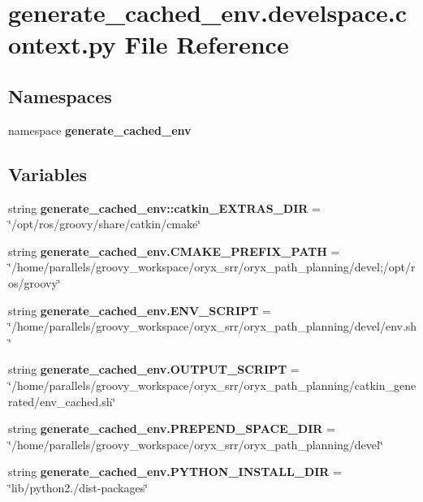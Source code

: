\section{generate\-\_\-cached\-\_\-env.\-develspace.\-context.\-py \-File \-Reference}
\label{generate__cached__env_8develspace_8context_8py}
\subsection*{\-Namespaces}
\begin{DoxyCompactItemize}
\item 
namespace {\bf generate\-\_\-cached\-\_\-env}
\end{DoxyCompactItemize}
\subsection*{\-Variables}
\begin{DoxyCompactItemize}
\item 
string {\bf generate\-\_\-cached\-\_\-env\-::catkin\-\_\-\-E\-X\-T\-R\-A\-S\-\_\-\-D\-I\-R} = \char`\"{}/opt/ros/groovy/share/catkin/cmake\char`\"{}
\item 
string {\bf generate\-\_\-cached\-\_\-env.\-C\-M\-A\-K\-E\-\_\-\-P\-R\-E\-F\-I\-X\-\_\-\-P\-A\-T\-H} = \char`\"{}/home/parallels/groovy\-\_\-workspace/oryx\-\_\-srr/oryx\-\_\-path\-\_\-planning/devel;/opt/ros/groovy\char`\"{}
\item 
string {\bf generate\-\_\-cached\-\_\-env.\-E\-N\-V\-\_\-\-S\-C\-R\-I\-P\-T} = \char`\"{}/home/parallels/groovy\-\_\-workspace/oryx\-\_\-srr/oryx\-\_\-path\-\_\-planning/devel/env.\-sh\char`\"{}
\item 
string {\bf generate\-\_\-cached\-\_\-env.\-O\-U\-T\-P\-U\-T\-\_\-\-S\-C\-R\-I\-P\-T} = \char`\"{}/home/parallels/groovy\-\_\-workspace/oryx\-\_\-srr/oryx\-\_\-path\-\_\-planning/catkin\-\_\-generated/env\-\_\-cached.\-sh\char`\"{}
\item 
string {\bf generate\-\_\-cached\-\_\-env.\-P\-R\-E\-P\-E\-N\-D\-\_\-\-S\-P\-A\-C\-E\-\_\-\-D\-I\-R} = \char`\"{}/home/parallels/groovy\-\_\-workspace/oryx\-\_\-srr/oryx\-\_\-path\-\_\-planning/devel\char`\"{}
\item 
string {\bf generate\-\_\-cached\-\_\-env.\-P\-Y\-T\-H\-O\-N\-\_\-\-I\-N\-S\-T\-A\-L\-L\-\_\-\-D\-I\-R} = \char`\"{}lib/python2./dist-\/packages\char`\"{}
\end{DoxyCompactItemize}
